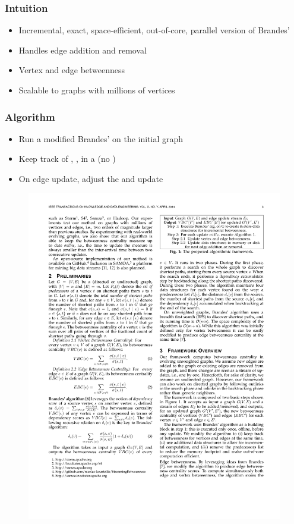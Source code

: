 \begin{frame}
  \frametitle{Intuition}

  \begin{itemize}
    \item Incremental, exact, space-efficient, out-of-core, parallel version of Brandes'
    \item Handles edge addition and removal
    \item Vertex and edge betweenness
    \item Scalable to graphs with millions of vertices
  \end{itemize}

\end{frame}


\begin{frame}
  \frametitle{Algorithm}

  \begin{itemize}
    \item Run a modified Brandes' on the initial graph
    \item Keep track of \dist, \paths, \dep in a \spdag (no \pred)
    \item On edge update, adjust the \spdag and update \betw
  \end{itemize}

  \begin{figure}[t]
    \centering
    \includegraphics[width=\textwidth, height=0.6\textheight, keepaspectratio]{imgs/kdb-algo}
  \end{figure}

\end{frame}


